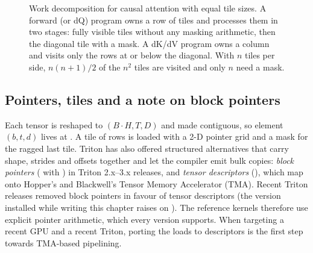 \begin{figure}[t]
\centering
{}
\caption{Work decomposition for causal attention with equal tile sizes. A forward (or dQ) program
owns a row of tiles and processes them in two stages: fully visible tiles without any masking
arithmetic, then the diagonal tile with a mask. A dK/dV program owns a column and visits only the
rows at or below the diagonal. With $n$ tiles per side, $n(n+1)/2$ of the $n^2$ tiles are visited
and only $n$ need a mask.}
\label{fig:perf:tiles}
\end{figure}

\subsection{Pointers, tiles and a note on block pointers}\label{sec:perf:fa2:blockptr}

Each tensor is reshaped to $(B\cdot H, T, D)$ and made contiguous, so element $(b, t, d)$ lives at
. A tile of rows  is loaded with a 2-D
pointer grid  and a mask for the ragged
last tile. Triton has also offered structured alternatives that carry shape, strides and offsets
together and let the compiler emit bulk copies: \emph{block pointers}
( with ) in Triton 2.x--3.x releases, and \emph{tensor
descriptors} (), which map onto Hopper's and Blackwell's Tensor
Memory Accelerator (TMA). Recent Triton releases removed block pointers in favour of tensor
descriptors (the version installed while writing this chapter raises
 on ). The reference kernels therefore use explicit
pointer arithmetic, which every version supports. When targeting a recent GPU and a recent
Triton, porting the loads to descriptors is the first step towards TMA-based pipelining.

